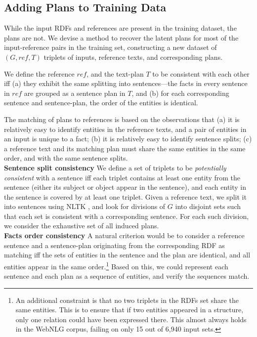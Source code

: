 \documentclass[11pt,a4paper]{article}
\begin{document}
\subsection{Adding Plans to Training Data}\label{sec:plan-train}
While the input RDFs and references are present in the training dataset, the plans are not. We devise a method to recover the latent plans for most of the input-reference pairs in the training set, constructing a new dataset of $(G, ref, T)$ triplets of inputs, reference texts, and corresponding plans.

We define the reference $ref$, and the text-plan $T$ to be consistent with each other iff (a) they exhibit the same splitting into sentences---the facts in every sentence in $ref$ are grouped as a sentence plan in $T$, and (b) for each corresponding sentence and sentence-plan, the order of the entities is identical.

The matching of plans to references is based on the observations that (a) it is relatively easy to identify entities in the reference texts, and a pair of entities in an input is unique to a fact; (b) it is relatively easy to identify sentence splits; (c) a reference text and its matching plan must share the same entities in the same order, and with the same sentence splits.\\
\textbf{Sentence split consistency }
We define a set of triplets to be \emph{potentially consistent} with a sentence
iff each triplet contains at least one entity from the sentence (either its subject or object appear in the sentence), and each entity in the sentence is covered by at least one triplet.
Given a reference text, we split it into sentences using NLTK \cite{bird2004nltk}, and look for divisions of $G$ into disjoint sets such that each set is consistent with a corresponding sentence. For each such division, we consider the exhaustive set of all induced plans.\\
\textbf{Facts order consistency } 
A natural criterion would be to consider a reference sentence and a sentence-plan originating from the corresponding RDF as matching iff the sets of entities in the sentence and the plan are identical, and all entities appear in the  same order.\footnote{An additional constraint is that no two triplets in the RDFs set share the same entities. This is to ensure that if two entities appeared in a structure, only one relation could have been expressed there. This almost always holds in the WebNLG corpus, failing on only 15 out of 6,940 input sets.}
Based on this, we could represent each sentence and each plan as a sequence of entities, and verify the sequences match.
\end{document}
